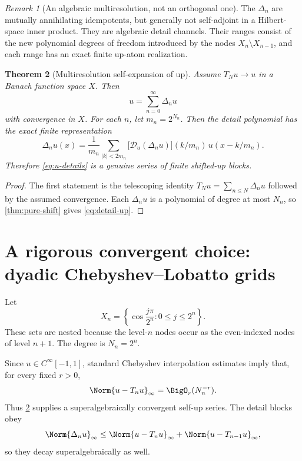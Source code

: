 \documentclass[11pt,oneside]{article}
\numberwithin{equation}{section}
\newtheorem{theorem}{Theorem}[section]
\theoremstyle{definition}
\theoremstyle{remark}
\newtheorem{remark}[theorem]{Remark}
\newcommand{\calD}{\mathscr D_u}
\begin{document}
\begin{remark}[An algebraic multiresolution, not an orthogonal one]
The \(\Delta_n\) are mutually annihilating idempotents, but generally not
self-adjoint in a Hilbert-space inner product.  They are algebraic detail channels.
Their ranges consist of the new polynomial degrees of freedom introduced by the
nodes \(X_n\setminus X_{n-1}\), and each range has an exact finite up-atom
realization.
\end{remark}

\begin{theorem}[Multiresolution self-expansion of up]
\label{thm:self-mra}
Assume \(T_Nu\to u\) in a Banach function space \(X\).  Then
\begin{equation}
 \boxed{u=\sum_{n=0}^{\infty}\Delta_nu}
 \label{eq:u-details}
\end{equation}
with convergence in \(X\).  For each \(n\), let \(m_n=2^{N_n}\).  Then the detail
polynomial has the exact finite representation
\begin{equation}
 \Delta_nu(x)=\frac1{m_n}\sum_{|k|<2m_n}
 \bigl[\calD(\Delta_nu)\bigr](k/m_n)\,u(x-k/m_n).
 \label{eq:detail-up}
\end{equation}
Therefore \eqref{eq:u-details} is a genuine series of finite shifted-up blocks.
\end{theorem}

\begin{proof}
The first statement is the telescoping identity
\(T_Nu=\sum_{n\le N}\Delta_nu\) followed by the assumed convergence.  Each
\(\Delta_nu\) is a polynomial of degree at most \(N_n\), so
\cref{thm:pure-shift} gives \eqref{eq:detail-up}.
\end{proof}

\section{A rigorous convergent choice: dyadic Chebyshev--Lobatto grids}
\label{sec:cheb}
Let
\begin{equation}
 X_n=\left\{\cos\frac{j\pi}{2^n}:0\le j\le2^n\right\}.
 \label{eq:cheb-grid}
\end{equation}
These sets are nested because the level-\(n\) nodes occur as the even-indexed
nodes of level \(n+1\).  The degree is \(N_n=2^n\).

Since \(u\in C^\infty[-1,1]\), standard Chebyshev interpolation estimates imply
that, for every fixed \(r>0\),
\begin{equation}
 \Norm{u-T_nu}_\infty=\BigO_r(N_n^{-r}).
 \label{eq:superalg}
\end{equation}
Thus \cref{thm:self-mra} supplies a superalgebraically convergent self-up series.
The detail blocks obey
\begin{equation}
 \Norm{\Delta_nu}_\infty
 \le \Norm{u-T_nu}_\infty+\Norm{u-T_{n-1}u}_\infty,
 \label{eq:detail-error}
\end{equation}
so they decay superalgebraically as well.
\end{document}
